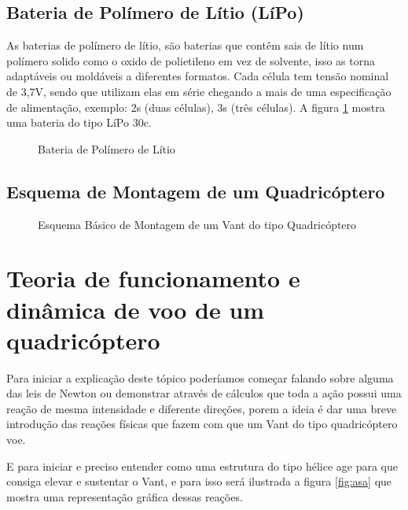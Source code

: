 \subsection{Bateria de Polímero de Lítio (LíPo)}
As baterias de polímero de lítio, são baterias que contêm sais de lítio num polímero solido como o oxido de polietileno em vez de solvente, isso as torna adaptáveis ou moldáveis a diferentes formatos. Cada célula tem tensão nominal de 3,7V, sendo que utilizam elas em série chegando a mais de uma especificação de alimentação, exemplo: 2s (duas células), 3s (três células). A figura \ref{fig:bat} mostra uma bateria do tipo LíPo 30c.
\begin{figure}[H]
	\centering
	\caption{Bateria de Polímero de Lítio}
	\fontsize{9pt}{12pt}\selectfont
	\def\svgwidth{15cm}
	
	\label{fig:bat}
\end{figure}

\subsection{Esquema de Montagem de um Quadricóptero}
\begin{figure}[H]
  \centering
  \caption{Esquema Básico de Montagem de um Vant do tipo Quadricóptero}
  \fontsize{9pt}{12pt}\selectfont
  \def\svgwidth{15cm}
  
  \label{fig:esquemamont}
\end{figure}
\section{Teoria de funcionamento e dinâmica de voo de um quadricóptero}

Para iniciar a explicação deste tópico poderíamos começar falando sobre alguma das leis de Newton ou demonstrar através de cálculos que toda a ação possui uma reação de mesma intensidade e diferente direções, porem a ideia é dar uma breve introdução das reações físicas que fazem com que um Vant do tipo quadricóptero voe. 

E para iniciar e preciso entender como uma estrutura do tipo hélice age para que consiga elevar e sustentar o Vant, e para isso será ilustrada a figura \ref{fig:asa} que mostra uma representação gráfica dessas reações. 

